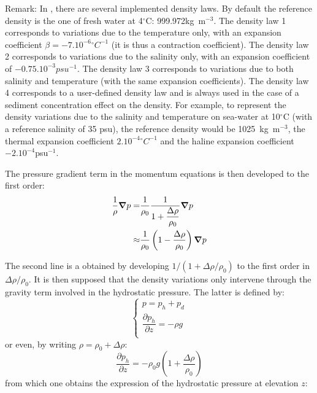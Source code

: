 \begin{CommentBlock}{Remark:}
In , there are several implemented density laws. By default the reference density
is the one of fresh water at 4$^\circ$C: 999.972kg~m$^{-3}$. The density law 1
corresponds to variations due to the temperature only, with an expansion coefficient
$\beta=-7.10^{-6}{}^\circ C^{-1}$  (it is thus a contraction coefficient).
The density law 2 corresponds to variations due to the
salinity only, with an expansion coefficient of $-0.75.10^{-3}psu^{-1}$.
The density law 3 corresponds to variations due to both salinity and temperature (with the
same expansion coefficients). The density law 4 corresponds to a user-defined
density law and is always used in the case of a sediment concentration effect on the density.
For example, to represent the density variations due to the salinity and temperature on
sea-water at 10$^\circ$C (with a reference salinity of 35 psu),
the reference density would be \mbox{1025 kg m$^{-3}$}, the thermal expansion coefficient
$2.10^{-4}{}^\circ C^{-1}$ and the haline expansion coefficient $-2.10^{-4}$psu$^{-1}$.
\end{CommentBlock}

The pressure gradient term in the momentum equations is then
developed to the first order:%
%
\begin{align}
  \dfrac{1}{\rho}\bm{\nabla} p  = & \dfrac{1}{\rho_0}\dfrac{1}{1+\dfrac{\Delta\rho}{\rho_0}}\bm{\nabla} p
  \notag \\
  \approx & \dfrac{1}{\rho_0}\left(1-\dfrac{\Delta\rho}{\rho_0}\right)\bm{\nabla} p
  \label{eq:grad_pres}
\end{align}

The second line is a obtained by developing $1/(1+\Delta\rho/\rho_0)$ to the first order in $\Delta\rho/\rho_0$.
It is then supposed that the density variations only intervene through the gravity term involved in the hydrostatic pressure.
The latter is defined by:
\begin{equation}
  \left\{
    \begin{array}{l}
      p = p_h + p_d \\
      \dfrac{\partial p_h}{\partial z}=-\rho g \\
    \end{array}
  \right.
\end{equation}
or even, by writing $\rho=\rho_{0}+\Delta\rho$:%
\begin{equation}
\dfrac{\partial p_h}{\partial z}=-\rho_{0}g\left(  1+\dfrac{\Delta\rho}{\rho_{0}%
}\right)
\end{equation}
from which one obtains the expression of the hydrostatic pressure at elevation $z$:%

